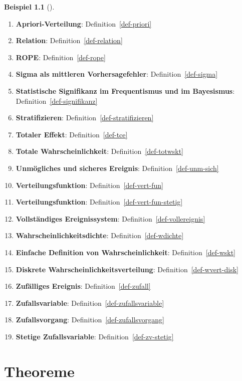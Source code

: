 \documentclass[
  ngerman,
  letterpaper,
  twoside,
  open=any]{scrbook}
\theoremstyle{definition}
\newtheorem{example}{Beispiel}[chapter]
\theoremstyle{plain}
\theoremstyle{definition}
\theoremstyle{definition}
\theoremstyle{remark}
\begin{document}
\begin{example}[]
\begin{enumerate}
  \textbf{Bedingte Wahrscheinlichkeit}: Definition~\ref{def-pr-cond}
\item
  \textbf{Apriori-Verteilung}: Definition~\ref{def-priori}
\item
  \textbf{Relation}: Definition~\ref{def-relation}
\item
  \textbf{ROPE}: Definition~\ref{def-rope}
\item
  \textbf{Sigma als mittleren Vorhersagefehler}:
  Definition~\ref{def-sigma}
\item
  \textbf{Statistische Signifikanz im Frequentismus und im Bayesismus}:
  Definition~\ref{def-signifikanz}
\item
  \textbf{Stratifizieren}: Definition~\ref{def-stratifizieren}
\item
  \textbf{Totaler Effekt}: Definition~\ref{def-tce}
\item
  \textbf{Totale Wahrscheinlichkeit}: Definition~\ref{def-totwskt}
\item
  \textbf{Unmögliches und sicheres Ereignis}:
  Definition~\ref{def-unm-sich}
\item
  \textbf{Verteilungsfunktion}: Definition~\ref{def-vert-fun}
\item
  \textbf{Verteilungsfunktion}: Definition~\ref{def-vert-fun-stetig}
\item
  \textbf{Vollständiges Ereignissystem}:
  Definition~\ref{def-vollereignis}
\item
  \textbf{Wahrscheinlichkeitsdichte}: Definition~\ref{def-wdichte}
\item
  \textbf{Einfache Definition von Wahrscheinlichkeit}:
  Definition~\ref{def-wskt}
\item
  \textbf{Diskrete Wahrscheinlichkeitsverteilung}:
  Definition~\ref{def-wvert-disk}
\item
  \textbf{Zufälliges Ereignis}: Definition~\ref{def-zufall}
\item
  \textbf{Zufallsvariable}: Definition~\ref{def-zufallsvariable}
\item
  \textbf{Zufallsvorgang}: Definition~\ref{def-zufallsvorgang}
\item
  \textbf{Stetige Zufallsvariable}: Definition~\ref{def-zv-stetig}
\end{enumerate}

\chapter{Theoreme}\label{theoreme}


\end{example}
\end{document}
